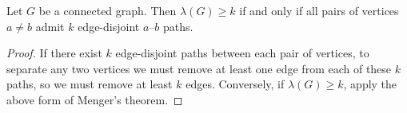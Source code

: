 \begin{theorem}
	Let \( G \) be a connected graph.
	Then \( \lambda(G) \geq k \) if and only if all pairs of vertices \( a \neq b \) admit \( k \) edge-disjoint \( a \)--\( b \) paths.
\end{theorem}
\begin{proof}
	If there exist \( k \) edge-disjoint paths between each pair of vertices, to separate any two vertices we must remove at least one edge from each of these \( k \) paths, so we must remove at least \( k \) edges.
	Conversely, if \( \lambda(G) \geq k \), apply the above form of Menger's theorem.
\end{proof}
